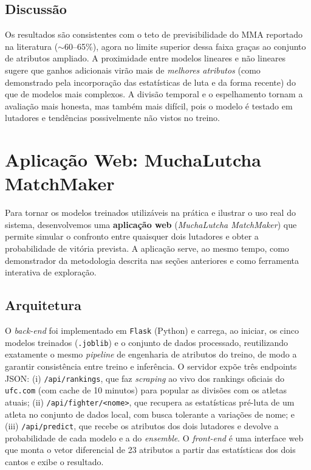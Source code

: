\documentclass[10pt]{article}
\begin{document}
\subsection{Discussão}
Os resultados são consistentes com o teto de previsibilidade do MMA reportado na
literatura ($\sim$60--65\%), agora no limite superior dessa faixa graças ao
conjunto de atributos ampliado. A proximidade entre modelos lineares e não
lineares sugere que ganhos adicionais virão mais de \emph{melhores atributos}
(como demonstrado pela incorporação das estatísticas de luta e da forma
recente) do que de modelos mais complexos. A divisão temporal e o
espelhamento tornam a avaliação mais honesta, mas também mais difícil, pois o
modelo é testado em lutadores e tendências possivelmente não vistos no treino.

\section{Aplicação Web: MuchaLutcha MatchMaker}
Para tornar os modelos treinados utilizáveis na prática e ilustrar o uso real do
sistema, desenvolvemos uma \textbf{aplicação web} (\emph{MuchaLutcha
MatchMaker}) que permite simular o confronto entre quaisquer dois lutadores e
obter a probabilidade de vitória prevista. A aplicação serve, ao mesmo tempo,
como demonstrador da metodologia descrita nas seções anteriores e como
ferramenta interativa de exploração.

\subsection{Arquitetura}
O \emph{back-end} foi implementado em \texttt{Flask} (Python) e carrega, ao
iniciar, os cinco modelos treinados (\texttt{.joblib}) e o conjunto de dados
processado, reutilizando exatamente o mesmo \emph{pipeline} de engenharia de
atributos do treino, de modo a garantir consistência entre treino e inferência.
O servidor expõe três endpoints JSON: (i) \texttt{/api/rankings}, que faz
\emph{scraping} ao vivo dos rankings oficiais do \texttt{ufc.com} (com cache de
10 minutos) para popular as divisões com os atletas atuais; (ii)
\texttt{/api/fighter/<nome>}, que recupera as estatísticas pré-luta de um atleta
no conjunto de dados local, com busca tolerante a variações de nome; e (iii)
\texttt{/api/predict}, que recebe os atributos dos dois lutadores e devolve a
probabilidade de cada modelo e a do \emph{ensemble}. O \emph{front-end} é uma
interface web que monta o vetor diferencial de 23 atributos a partir das
estatísticas dos dois cantos e exibe o resultado.
\end{document}
